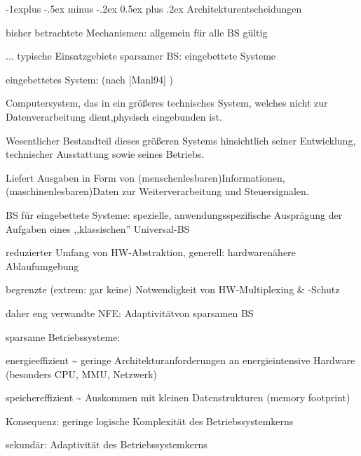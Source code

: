 \documentclass[a4paper]{article}
\makeatletter
\renewcommand{\subsection}{\@startsection{subsection}{2}{0mm}%
 {-1explus -.5ex minus -.2ex}%
 {0.5ex plus .2ex}%
 {\normalfont\normalsize\bfseries}}
\makeatother
\begin{document}
\begin{multicols}{3}
    \subsection{Architekturentscheidungen}

    \begin{itemize*}
        \item
        bisher betrachtete Mechanismen: allgemein für alle BS gültig
        \item
        ... typische Einsatzgebiete sparsamer BS: eingebettete Systeme
        \item
        eingebettetes System: (nach {[}Manl94{]} )
        \begin{itemize*}
            \item Computersystem, das in ein größeres technisches System, welches nicht zur Datenverarbeitung dient,physisch eingebunden ist.
            \item Wesentlicher Bestandteil dieses größeren Systems hinsichtlich seiner Entwicklung, technischer Ausstattung sowie seines Betriebs.
            \item Liefert Ausgaben in Form von (menschenlesbaren)Informationen, (maschinenlesbaren)Daten zur Weiterverarbeitung und Steuersignalen.
        \end{itemize*}
        \item
        BS für eingebettete Systeme: spezielle, anwendungsspezifische
        Ausprägung der Aufgaben eines ,,klassischen'' Universal-BS
        \begin{itemize*}
            \item reduzierter Umfang von HW-Abstraktion, generell: hardwarenähere Ablaufumgebung
            \item begrenzte (extrem: gar keine) Notwendigkeit von HW-Multiplexing \& -Schutz
        \end{itemize*}
        \item
        daher eng verwandte NFE: Adaptivitätvon sparsamen BS
        \item
        sparsame Betriebssysteme:
        \begin{itemize*}
            \item energieeffizient \textasciitilde{} geringe Architekturanforderungen an energieintensive Hardware (besonders CPU, MMU, Netzwerk)
            \item speichereffizient \textasciitilde{} Auskommen mit kleinen Datenstrukturen (memory footprint)
        \end{itemize*}
        \item
        Konsequenz: geringe logische Komplexität des Betriebssystemkerns
        \item
        sekundär: Adaptivität des Betriebssystemkerns
    \end{itemize*}



\end{multicols}
\end{document}
